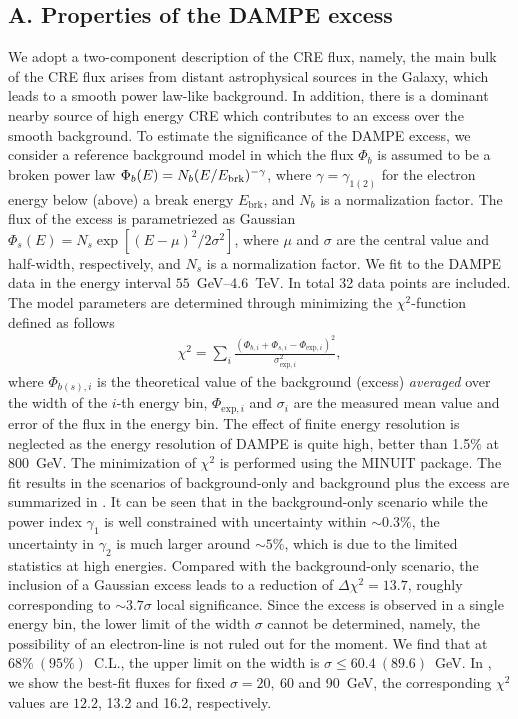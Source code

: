 \subsection{A. Properties of the DAMPE excess}
We adopt a two-component description of the 
CRE flux, namely, the main bulk of the CRE flux
arises  from  distant astrophysical sources in the Galaxy,
which  leads to  a smooth power law-like background.
In addition, there is a dominant nearby source of high energy CRE which 
contributes to an excess over the smooth background.
To estimate the significance of the DAMPE excess, 
we consider a  reference  background model in which  the flux $\Phi_{b}$ 
is assumed to be a broken power law 
$\Phi_{b}(E)=N_{b} (E/E_{\text{brk}})^{-\gamma}$, 
where $\gamma=\gamma_{1(2)}$ for 
the electron energy below (above) a break energy $E_{\text{brk}}$, 
and $N_{b}$ is a normalization factor. 
The flux of  the  excess is parametriezed as  Gaussian 
$\Phi_{s}(E)=N_{s} \exp[(E-\mu)^{2}/2\sigma^{2}]$,
where
$\mu$ and $\sigma$ are the central value and half-width, respectively,
and $N_{s}$ is a normalization factor.
We fit to the DAMPE data in the energy interval $55$~GeV--4.6~TeV.
In total 32 data points are included.
The model parameters are determined through 
minimizing the $\chi^{2}$-function defined as follows
\begin{align}
\chi^{2}=\sum_{i}
\frac{(\Phi_{b,i}+\Phi_{s,i}-\Phi_{\text{exp},i})^{2}}{\sigma_{\text{exp},i}^{2}},
\end{align}
where $\Phi_{b(s),i}$ is the theoretical value of the  
background (excess)  {\it averaged} over the width of the $i$-th energy bin,
$\Phi_{\text{exp},i}$ and $\sigma_{i}$ are the measured mean value 
and error of the flux in the energy bin.
The effect of finite energy resolution is neglected as the energy resolution
of DAMPE is quite high, better than 1.5$\%$ at 800~GeV.
The minimization of $\chi^{2}$ is performed using the MINUIT package.
The fit results in the scenarios of background-only and background plus the 
excess are  summarized in .
It can be seen that in the background-only scenario
while the power index $\gamma_{1}$ is well constrained 
with uncertainty within $\sim 0.3\%$,
the uncertainty in $\gamma_{2}$ is much  larger around $\sim 5\%$,
which is due to the limited statistics at high energies.
Compared with the background-only scenario, the inclusion of 
a Gaussian excess leads to a reduction of $\Delta\chi^{2}=13.7$, 
roughly corresponding to  $\sim 3.7\sigma$ local significance.
Since  the excess is observed in a single energy bin, 
the lower limit of the width $\sigma$ cannot be determined,
namely, the possibility of an electron-line is not ruled out for the moment.
We find that at $68\% ~(95\%)$~C.L., 
the upper limit on the width is $\sigma \leq 60.4~(89.6)$~GeV.
In , we show the best-fit fluxes for fixed
$\sigma=20,\ 60$ and 90~GeV, the corresponding $\chi^{2}$ values are
$12.2$, 13.2 and 16.2, respectively.


